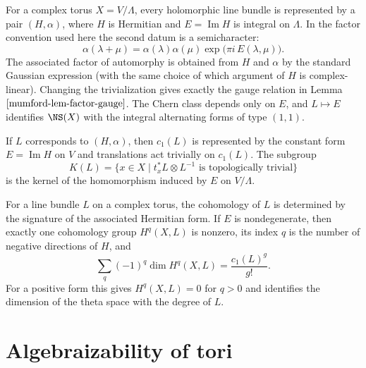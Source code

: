 \begin{theorem}
\label{mumford-thm-appell-humbert}
For a complex torus $X=V/\Lambda$, every holomorphic line bundle is represented
by a pair $(H,\alpha)$, where $H$ is Hermitian and
$E=\operatorname{Im}H$ is integral on $\Lambda$.  In the factor convention
used here the second datum is a semicharacter:
\[
 \alpha(\lambda+\mu)=\alpha(\lambda)\alpha(\mu)
   \exp\!\bigl(\pi i\,E(\lambda,\mu)\bigr).
\]
The associated factor of automorphy is obtained from $H$ and $\alpha$ by the
standard Gaussian expression (with the same choice of which argument of $H$
is complex-linear).  Changing the trivialization gives exactly the gauge
relation in Lemma~$\ref{mumford-lem-factor-gauge}$.  The Chern class depends
only on $E$, and $L\mapsto E$
identifies $\NS(X)$ with the integral alternating forms of type $(1,1)$.
\notready
\end{theorem}

\begin{proposition}
\label{mumford-prop-analytic-c1-translation}
If $L$ corresponds to $(H,\alpha)$, then $c_1(L)$ is represented by the
constant form $E=\operatorname{Im}H$ on $V$ and translations act trivially on
$c_1(L)$.  The subgroup
\[
 K(L)=\{x\in X\mid t_x^*L\otimes L^{-1}\text{ is topologically trivial}\}
\]
is the kernel of the homomorphism induced by $E$ on $V/\Lambda$.
\notready
\end{proposition}

\begin{theorem}
\label{mumford-thm-analytic-theta-index}
For a line bundle $L$ on a complex torus, the cohomology of $L$ is determined
by the signature of the associated Hermitian form.  If $E$ is nondegenerate,
then exactly one cohomology group $H^q(X,L)$ is nonzero, its index $q$ is the
number of negative directions of $H$, and
\[
 \sum_q(-1)^q\dim H^q(X,L)=\frac{c_1(L)^g}{g!}.
\]
For a positive form this gives $H^q(X,L)=0$ for $q>0$ and identifies the
dimension of the theta space with the degree of $L$.
\notready
\end{theorem}

\section{Algebraizability of tori}
\label{mumford-I3}

